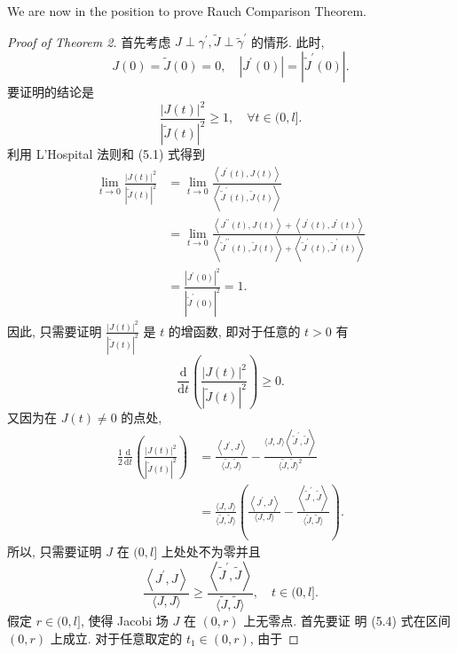 \documentclass{ctexart}
\begin{document}
We are now in the position to prove Rauch Comparison Theorem.
\begin{proof}[Proof of Theorem 2]
  首先考虑 $J \perp \gamma^{\prime}, \tilde{J} \perp \tilde{\gamma}^{\prime}$ 的情形. 此时,
  $$
  J(0)=\tilde{J}(0)=0, \quad\left|J^{\prime}(0)\right|=\left|\tilde{J}^{\prime}(0)\right| .
  $$
  要证明的结论是
  $$
  \frac{|J(t)|^2}{|\tilde{J}(t)|^2} \geq 1, \quad \forall t \in(0, l] .
  $$
  利用 L'Hospital 法则和 (5.1) 式得到
  $$
  \begin{aligned}
  \lim _{t \rightarrow 0} \frac{|J(t)|^2}{|\tilde{J}(t)|^2} & =\lim _{t \rightarrow 0} \frac{\left\langle J^{\prime}(t), J(t)\right\rangle}{\left\langle\tilde{J}^{\prime}(t), \tilde{J}(t)\right\rangle} \\
  & =\lim _{t \rightarrow 0} \frac{\left\langle J^{\prime \prime}(t), J(t)\right\rangle+\left\langle J^{\prime}(t), J^{\prime}(t)\right\rangle}{\left\langle\tilde{J}^{\prime \prime}(t), \tilde{J}(t)\right\rangle+\left\langle\tilde{J}^{\prime}(t), \tilde{J}^{\prime}(t)\right\rangle} \\
  & =\frac{\left|J^{\prime}(0)\right|^2}{\left|\tilde{J}^{\prime}(0)\right|^2}=1 .
  \end{aligned}
  $$
  因此, 只需要证明 $\frac{|J(t)|^2}{|\tilde{J}(t)|^2}$ 是 $t$ 的增函数, 即对于任意的 $t>0$ 有
  $$
  \frac{\mathrm{d}}{\mathrm{d} t}\left(\frac{|J(t)|^2}{|\tilde{J}(t)|^2}\right) \geq 0 .
  $$
  又因为在 $J(t) \neq 0$ 的点处,
  $$
  \begin{aligned}
  \frac{1}{2} \frac{\mathrm{d}}{\mathrm{d} t}\left(\frac{|J(t)|^2}{|\tilde{J}(t)|^2}\right) & =\frac{\left\langle J^{\prime}, J\right\rangle}{\langle\tilde{J}, \tilde{J}\rangle}-\frac{\langle J, J\rangle\left\langle\tilde{J}^{\prime}, \tilde{J}\right\rangle}{\langle\tilde{J}, \tilde{J}\rangle^2} \\
  & =\frac{\langle J, J\rangle}{\langle\tilde{J}, \tilde{J}\rangle}\left(\frac{\left\langle J^{\prime}, J\right\rangle}{\langle J, J\rangle}-\frac{\left\langle\tilde{J}^{\prime}, \tilde{J}\right\rangle}{\langle\tilde{J}, \tilde{J}\rangle}\right) .
  \end{aligned}
  $$
  所以, 只需要证明 $J$ 在 $(0, l]$ 上处处不为零并且
  $$
  \frac{\left\langle J^{\prime}, J\right\rangle}{\langle J, J\rangle} \geq \frac{\left\langle\tilde{J}^{\prime}, \tilde{J}\right\rangle}{\langle\tilde{J}, \tilde{J}\rangle}, \quad t \in(0, l] .
  $$
  假定 $r \in(0, l]$, 使得 Jacobi 场 $J$ 在 $(0, r)$ 上无零点. 首先要证 明 (5.4) 式在区间 $(0, r)$ 上成立. 对于任意取定的 $t_1 \in(0, r)$, 由于
\end{proof}
\end{document}
